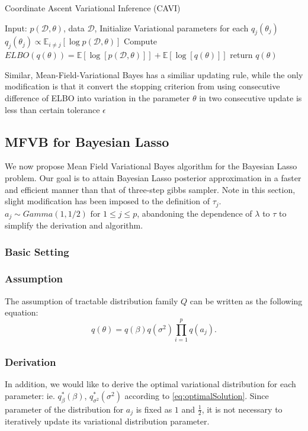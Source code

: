 \begin{algorithm}
	\caption{Coordinate Ascent Variational Inference (CAVI)}
	\begin{algorithmic}[1]
		
		\State Input: $p(\mathcal{D},\theta)$, data $\mathcal{D}$, Initialize Variational parameters for each $q_j(\theta_j)$
		\State $q_j(\theta_j) \propto \mathbb{E}_{i\neq j}[\log p(\mathcal{D},\theta)]$
		\EndFor
		\State Compute $ELBO(q(\theta)) = \mathbb{E}[\log[p(\mathcal{D},\theta)]] + \mathbb{E}[\log[q(\theta)]]$
		\EndWhile 
		\State return $q(\theta)$
		
		
		
	\end{algorithmic}
\end{algorithm}
Similar, Mean-Field-Variational Bayes has a similiar updating rule, while the only modification is that it convert the stopping criterion from using consecutive difference of ELBO into variation in the parameter $\theta$ in two consecutive update is less than certain tolerance $\epsilon$

\newpage
\subsection{MFVB for Bayesian Lasso}
We now propose Mean Field Variational Bayes algorithm for the Bayesian Lasso problem. Our goal is to attain Bayesian Lasso posterior approximation in a faster and efficient manner than that of three-step gibbs sampler. Note in this section, slight modification has been imposed to the definition of $\tau_j$. $a_j \sim Gamma(1,1/2)\text{ for }1\leq j \leq p$, abandoning the dependence of $\lambda$ to $\tau$ to simplify the derivation and algorithm.
\subsubsection{Basic Setting}

\subsubsection{Assumption}
The assumption of tractable distribution family $Q$ can be written as the following equation:
\begin{equation}
	q(\theta) = q(\beta)q(\sigma^2)\prod_{i=1}^p q(a_j).
\end{equation}

\subsubsection{Derivation}
In addition, we would like to derive the optimal variational distribution for each parameter: ie. $q_{\beta}^*(\beta)$, $q_{\sigma^2}^*(\sigma^2)$ according to \autoref{eq:optimalSolution}. Since parameter of the distribution for $a_j$ is fixed as $1$ and $\frac{1}{2}$, it is not necessary to iteratively update its variational distribution parameter.\\

